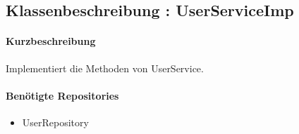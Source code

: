 \subsection{Klassenbeschreibung : UserServiceImp}%
\paragraph*{Kurzbeschreibung}
Implementiert die Methoden von UserService.
\paragraph*{Benötigte Repositories}
\begin{itemize}
    \item UserRepository
\end{itemize}